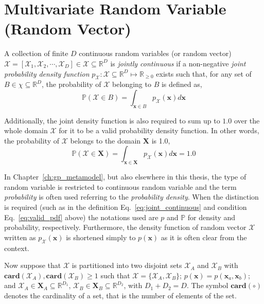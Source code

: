 \section{Multivariate Random Variable (Random Vector)}\label{app:probability}

A collection of finite $D$ continuous random variables (or random vector) $\bm{\mathcal{X}} = [\mathcal{X}_1, \mathcal{X}_2, \cdots, \mathcal{X}_D] \in \mathcal{X} \subseteq \mathbb{R}^D$ is \emph{jointly continuous} if a non-negative \emph{joint probability density function} $p_{\bm{\mathcal{X}}}: \mathcal{X} \subseteq \mathbb{R}^D \mapsto \mathbb{R}_{\geq 0}$ exists such that, for any set of $B \in \chi \subseteq \mathbb{R}^D$, the probability of $\bm{\mathcal{X}}$ belonging to $B$ is defined as,
\begin{equation}
  \mathbb{P} (\bm{\mathcal{X}} \in B) = \int_{\mathbf{x} \in B} p_{\bm{\mathcal{X}}} (\mathbf{x}) d\mathbf{x}
\label{eq:joint_continuous}
\end{equation}

Additionally,
the joint density function is also required to sum up to $1.0$ over the whole domain $\mathcal{X}$ for it to be a valid probability density function.
In other words, the probability of $\mathcal{X}$ belongs to the domain $\mathbf{X}$ is 1.0,
\begin{equation}
  \mathbb{P} (\mathcal{X} \in \mathbf{X}) = \int_{\mathbf{x} \in \mathbf{X}} p_{\bm{\mathcal{X}}} (\mathbf{x}) d\mathbf{x} = 1.0
\label{eq:valid_pdf}
\end{equation}

In Chapter~\ref{ch:gp_metamodel}, but also elsewhere in this thesis, the type of random variable is restricted to continuous random variable and the term \emph{probability} is often used referring to the \emph{probability density}.
When the distinction is required (such as in the definition Eq.~\ref{eq:joint_continuous} and condition Eq.~\ref{eq:valid_pdf} above) the notations used are $p$ and $\mathbb{P}$ for density and probability, respectively.
Furthermore, the density function of random vector $\bm{\mathcal{X}}$ written as $p_{\bm{\mathcal{X}}} (\mathbf{x})$ is shortened simply to $p (\mathbf{x})$ as it is often clear from the context.

Now suppose that $\bm{\mathcal{X}}$ is partitioned into two disjoint sets $\bm{\mathcal{X}}_A$ and $\bm{\mathcal{X}}_B$ with $\mathbf{card}(\bm{\mathcal{X}}_A), \mathbf{card}(\bm{\mathcal{X}}_B) \geq 1$ 
such that $\bm{\mathcal{X}} = \{\bm{\mathcal{X}}_A, \bm{\mathcal{X}}_B\}$; 
$p(\mathbf{x}) = p(\mathbf{x}_a,\mathbf{x}_b)$; 
and $\bm{\mathcal{X}}_A \in \mathbf{X}_A \subseteq \mathbb{R}^{D_1}$, $\bm{\mathcal{X}}_B \in \mathbf{X}_B \subseteq \mathbb{R}^{D_2}$, with $D_1 + D_2 = D$.
The symbol $\mathbf{card} (\circ)$ denotes the cardinality of a set, that is the number of elements of the set.
  
